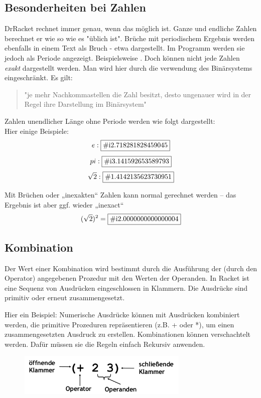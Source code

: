 \subsection{Besonderheiten bei Zahlen}
DrRacket rechnet immer genau, wenn das möglich ist. Ganze und endliche Zahlen berechnet er wie so wie es "üblich ist". Brüche mit periodischem Ergebnis werden ebenfalls in einem Text als Bruch - etwa  dargestellt. Im Programm werden sie jedoch als Periode angezeigt. Beispielsweise .
Doch können nicht jede Zahlen \textit{exakt} dargestellt werden. Man wird hier durch die verwendung des Binärsystems eingeschränkt. Es gilt:
\begin{quote}
	"je mehr Nachkommastellen die Zahl besitzt, desto ungenauer wird in der Regel ihre Darstellung im Binärsystem"
\end{quote}

Zahlen unendlicher Länge ohne Periode werden wie folgt dargestellt: \\
Hier einige Beispiele:
$$e: \fbox{\#i2.718281828459045}$$
$$pi: \fbox{\#i3.141592653589793}$$
$$\sqrt{2}: \fbox{\#1.4142135623730951}$$

Mit Brüchen oder „inexakten“ Zahlen kann normal gerechnet
werden – das Ergebnis ist aber ggf. wieder „inexact“
$$(\sqrt{2})^2 = \fbox{\#i2.0000000000000004}$$

\subsection{Kombination}
Der Wert einer Kombination wird bestimmt durch die Ausführung der (durch den Operator) angegebenen Prozedur mit den Werten der Operanden. In Racket ist eine Sequenz von Ausdrücken eingeschlossen in Klammern. Die Ausdrücke sind primitiv oder erneut zusammengesetzt.



Hier ein Beispiel:
Numerische Ausdrücke können mit Ausdrücken kombiniert werden,
die primitive Prozeduren repräsentieren (z.B. + oder *), um einen
zusammengesetzten Ausdruck zu erstellen.
Kombinationen können verschachtelt werden. Dafür müssen sie die Regeln einfach Rekursiv anwenden.
\begin{figure}
	\begin{center}
		\includegraphics[height=2cm]{Bilder/T01_Sprachelemente_Kombination}
		\caption{}\label{t01_sk}
	\end{center}
\end{figure}

